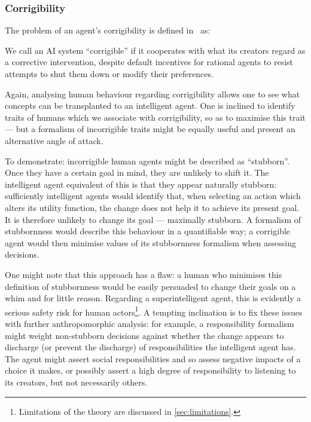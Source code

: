 \subsubsection{Corrigibility}
The problem of an agent's corrigibility is defined in~\cite{corrigibility} as:

\begin{displayquote}
We call an AI system ``corrigible'' if it cooperates with what its creators regard as a corrective intervention, despite default incentives for rational agents to resist attempts to shut them down or modify their preferences.
\end{displayquote}

Again, analysing human behaviour regarding corrigibility allows one to see what concepts can be transplanted to an intelligent agent. One is inclined to identify traits of humans which we associate with corrigibility, so as to maximise this trait --- but a formalism of incorrigible traits might be equally useful and present an alternative angle of attack.\par

To demonstrate: incorrigible human agents might be described as ``stubborn''. Once they have a certain goal in mind, they are unlikely to shift it. The intelligent agent equivalent of this is that they appear naturally stubborn: sufficiently intelligent agents would identify that, when selecting an action which alters its utility function, the change does not help it to achieve its present goal. It is therefore unlikely to change its goal --- maximally stubborn. A formalism of stubbornness would describe this behaviour in a quantifiable way; a corrigible agent would then minimise values of its stubbornness formalism when assessing decisions.\par

One might note that this approach has a flaw: a human who minimises this definition of stubbornness would be easily persuaded to change their goals on a whim and for little reason. Regarding a superintelligent agent, this is evidently a serious safety risk for human actors\footnote{Limitations of the theory are discussed in \cref{sec:limitations}.}. A tempting inclination is to fix these issues with further anthropomorphic analysis: for example, a responsibility formalism might weight non-stubborn decisions against whether the change appears to discharge (or prevent the discharge) of responsibilities the intelligent agent has. The agent might assert social responsibilities and so assess negative impacts of a choice it makes, or possibly assert a high degree of responsibility to listening to its creators, but not necessarily others. \par

